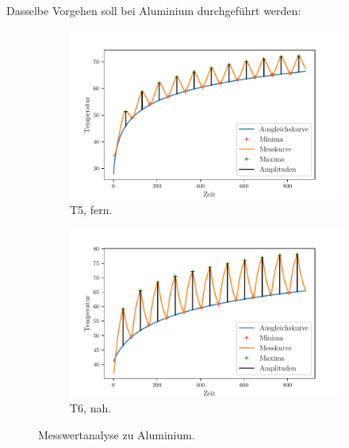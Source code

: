 Dasselbe Vorgehen soll bei Aluminium durchgeführt werden:
\begin{figure}
    \centering
    \begin{subfigure}{.5\textwidth}
        \centering
        \includegraphics[max width=1.1\linewidth]{plots/amplitudes_aluminum_far(t5).pdf}
        \caption{T5, fern.}
        \label{fig:plot_amps_t5}
    \end{subfigure}%
    \begin{subfigure}{.5\textwidth}
        \centering
        \includegraphics[max width=1.1\linewidth]{plots/amplitudes_aluminum_close(t6).pdf}
        \caption{T6, nah.}
        \label{fig:plot_amps_t6}
    \end{subfigure}
    \caption{Messwertanalyse zu Aluminium.}
    \label{fig:plots_amps_t5_t6}
\end{figure}

